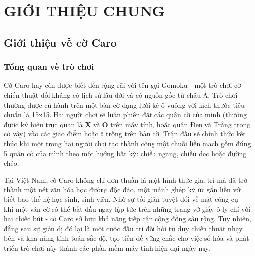 
\chapter{GIỚI THIỆU CHUNG} %

\label{Chapter1} %


\newcommand{\keyword}[1]{\textbf{#1}}
\newcommand{\tabhead}[1]{\textbf{#1}}
\newcommand{\code}[1]{\texttt{#1}}
\newcommand{\file}[1]{\texttt{\bfseries#1}}
\newcommand{\option}[1]{\texttt{\itshape#1}}


\section{Giới thiệu về cờ Caro}
\subsection{Tổng quan về trò chơi}

Cờ Caro hay còn được biết đến rộng rãi với tên gọi Gomoku - một trò chơi cờ chiến thuật đối kháng có lịch sử lâu đời và có nguồn gốc từ châu Á. Trò chơi thường được cử hành trên một bàn cờ dạng lưới kẻ ô vuông với kích thước tiêu chuẩn là 15x15. Hai người chơi sẽ luân phiên đặt các quân cờ của mình (thường được ký hiệu trực quan là \textbf{X} và \textbf{O} trên máy tính, hoặc quân Đen và Trắng trong cờ vây) vào các giao điểm hoặc ô trống trên bàn cờ. Trận đấu sẽ chính thức kết thúc khi một trong hai người chơi tạo thành công một chuỗi liền mạch gồm đúng 5 quân cờ của mình theo một hướng bất kỳ: chiều ngang, chiều dọc hoặc đường chéo. 

Tại Việt Nam, cờ Caro không chỉ đơn thuần là một hình thức giải trí mà đã trở thành một nét văn hóa học đường độc đáo, một mảnh ghép ký ức gắn liền với biết bao thế hệ học sinh, sinh viên. Nhờ sự tối giản tuyệt đối về mặt công cụ - khi một ván cờ có thể bắt đầu ngay lập tức trên những trang vở giấy ô ly chỉ với hai chiếc bút - cờ Caro sở hữu khả năng tiếp cận cộng đồng sâu rộng. Tuy nhiên, đằng sau sự giản dị đó lại là một cuộc đấu trí đòi hỏi tư duy chiến thuật nhạy bén và khả năng tính toán sắc độ, tạo tiền đề vững chắc cho việc số hóa và phát triển trò chơi này thành các phần mềm máy tính hiện đại ngày nay.

